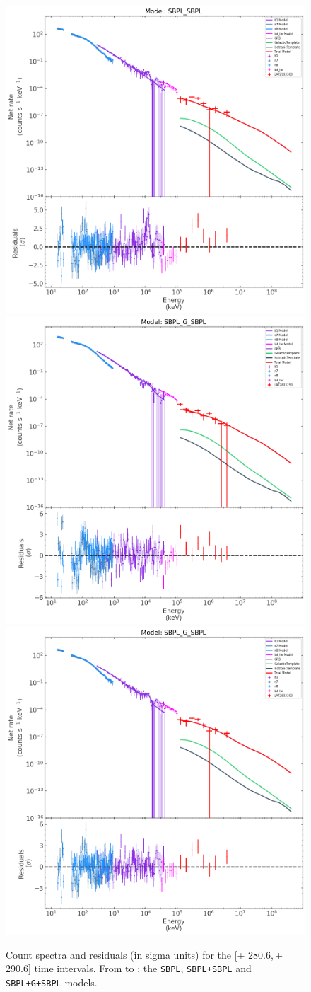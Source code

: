 \documentclass[preprint]{aastex631}
\begin{document}
\begin{figure}[t]
    \includegraphics[width=0.4\linewidth]{spectrum_290p61-300p61_SBPL_SBPL.png}\\
    \includegraphics[width=0.4\linewidth]{best_spectrum_280p61-290p61_SBPL_G_SBPL.png}
    \includegraphics[width=0.4\linewidth]{best_spectrum_290p61-300p61_SBPL_G_SBPL.png}
\caption{Count spectra  and residuals (in sigma units) for the [\trig+ 280.6,\,\trig+ 290.6]   time intervals. From  to : the \texttt{SBPL}, \texttt{SBPL+SBPL} and \texttt{SBPL+G+SBPL} models.}
    \label{fig:interval12}
\end{figure}
\end{document}
